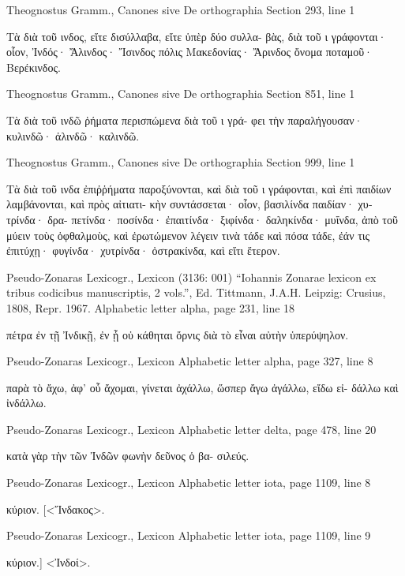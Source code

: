 \documentclass[12pt,letterpaper,twoside,final]{memoir}
\begin{document}
\begin{greek}
Theognostus Gramm., Canones sive De orthographia 
Section 293, line 1

Τὰ διὰ τοῦ ινδος, εἴτε δισύλλαβα, εἴτε ὑπὲρ δύο συλλα-
βὰς, διὰ τοῦ ι γράφονται· οἷον, Ἰνδός· Ἄλινδος· Ἴσινδος 
πόλις Μακεδονίας· Ἄρινδος ὄνομα ποταμοῦ· Βερέκινδος. 



Theognostus Gramm., Canones sive De orthographia 
Section 851, line 1

Τὰ διὰ τοῦ ινδῶ ῥήματα περισπώμενα διὰ τοῦ ι γρά-
φει τὴν παραλήγουσαν· κυλινδῶ· ἀλινδῶ· καλινδῶ. 



Theognostus Gramm., Canones sive De orthographia 
Section 999, line 1

Τὰ διὰ τοῦ ινδα ἐπιῤῥήματα παροξύνονται, καὶ διὰ τοῦ ι 
γράφονται, καὶ ἐπὶ παιδίων λαμβάνονται, καὶ πρὸς αἰτιατι-
κὴν συντάσσεται· οἷον, βασιλίνδα παιδίαν· χυτρίνδα· δρα-
πετίνδα· ποσίνδα· ἐπαιτίνδα· ξιφίνδα· δαληκίνδα· μυΐνδα, 
ἀπὸ τοῦ μύειν τοὺς ὀφθαλμοὺς, καὶ ἐρωτώμενον λέγειν τινὰ   
τάδε καὶ πόσα τάδε, ἐάν τις ἐπιτύχῃ· φυγίνδα· χυτρίνδα· 
ὀστρακίνδα, καὶ εἴτι ἕτερον. 



Pseudo-Zonaras Lexicogr., Lexicon (3136: 001)
“Iohannis Zonarae lexicon ex tribus codicibus manuscriptis, 2 vols.”, Ed. Tittmann, J.A.H.
Leipzig: Crusius, 1808, Repr. 1967.
Alphabetic letter alpha, page 231, line 18

               πέτρα ἐν τῇ Ἰνδικῇ, ἐν ᾗ οὐ κάθηται 
 ὄρνις διὰ τὸ εἶναι αὐτὴν ὑπερύψηλον. 



Pseudo-Zonaras Lexicogr., Lexicon 
Alphabetic letter alpha, page 327, line 8

                παρὰ τὸ ἄχω, ἀφ' οὗ ἄχομαι, 
 γίνεται ἀχάλλω, ὥσπερ ἄγω ἀγάλλω, εἴδω εἰ-
 δάλλω καὶ ἰνδάλλω. 



Pseudo-Zonaras Lexicogr., Lexicon 
Alphabetic letter delta, page 478, line 20

κατὰ γὰρ τὴν τῶν Ἰνδῶν φωνὴν δεῦνος ὁ βα-
 σιλεύς. 



Pseudo-Zonaras Lexicogr., Lexicon 
Alphabetic letter iota, page 1109, line 8

                 κύριον. 
[<Ἴνδακος>. 



Pseudo-Zonaras Lexicogr., Lexicon 
Alphabetic letter iota, page 1109, line 9

                 κύριον.] 
<Ἰνδοί>. 




\end{greek}
\end{document}

